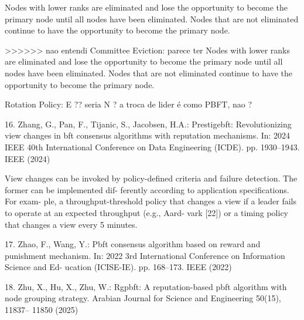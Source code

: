 Nodes with lower ranks are eliminated
and lose the opportunity to become the primary node until
all nodes have been eliminated. Nodes that are not eliminated
continue to have the opportunity to become the primary node.

>>>>>>  nao entendi 
               Committee Eviction:    parece ter 
               Nodes with lower ranks are eliminated
and lose the opportunity to become the primary node until
all nodes have been eliminated. Nodes that are not eliminated
continue to have the opportunity to become the primary node.

               Rotation Policy:   E ??     seria N ?     a troca de lider é como PBFT, nao ?
               
               
               








16. Zhang, G., Pan, F., Tijanic, S., Jacobsen, H.A.: Prestigebft: Revolutionizing view
changes in bft consensus algorithms with reputation mechanisms. In: 2024 IEEE
40th International Conference on Data Engineering (ICDE). pp. 1930–1943. IEEE
(2024)

View changes can be invoked by policy-defined criteria
and failure detection. The former can be implemented dif-
ferently according to application specifications. For exam-
ple, a throughput-threshold policy that changes a view if a
leader fails to operate at an expected throughput (e.g., Aard-
vark [22]) or a timing policy that changes a view every 5
minutes. 








17. Zhao, F., Wang, Y.: Pbft consensus algorithm based on reward and punishment
mechanism. In: 2022 3rd International Conference on Information Science and Ed-
ucation (ICISE-IE). pp. 168–173. IEEE (2022)







18. Zhu, X., Hu, X., Zhu, W.: Rgpbft: A reputation-based pbft algorithm with node
grouping strategy. Arabian Journal for Science and Engineering 50(15), 11837–
11850 (2025)






